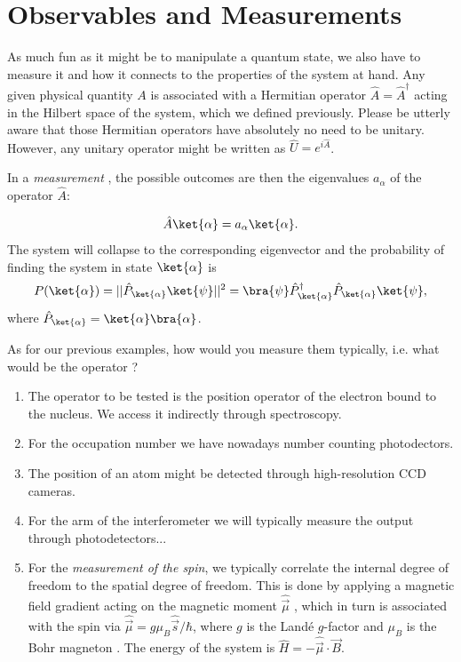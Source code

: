 \section{Observables and Measurements}
As much fun as it might be to manipulate a quantum state, we also have to measure it and how it connects to the properties of the system at hand. Any given physical quantity $A$ is associated with a Hermitian operator $\hat{A} = \hat{A}^\dag$ acting in the Hilbert space of the system, which we defined previously. Please be utterly aware that those Hermitian operators have absolutely no need to be unitary. However, any unitary operator might be written as $\hat{U}= e^{i\hat{A}}$.

In a \emph{measurement} , the possible outcomes are then the eigenvalues $a_\alpha$  of the operator $\hat{A}$:

\begin{align}
	\hat{A}\ket{\alpha}=a_{\alpha}\ket{\alpha}.
\end{align}
The system will collapse to the corresponding eigenvector and the probability of finding the system in state $\ket{\alpha}$ is
\begin{align}
	P(\ket{\alpha})=||\hat{P}_{\ket{\alpha}} \ket{\psi}||^2 = \bra{\psi} \hat{P}^{\dag}_{\ket{\alpha}} \hat{P}_{\ket{\alpha}} \ket{\psi},
\end{align}
where $\hat{P}_{\ket{\alpha}}= \ket{\alpha} \bra{\alpha}$.

As for our previous examples, how would you measure them typically, i.e. what would be the operator ?
\begin{enumerate}
\item The operator to be tested is the position operator of the electron bound to the nucleus. We access it indirectly through spectroscopy.
\item For the occupation number we have nowadays number counting photodectors.
\item The position of an atom might be detected through high-resolution CCD cameras.
\item For the arm of the interferometer we will typically measure the output through photodetectors...
\item For the \textit{measurement of the spin}, we typically correlate the internal degree of freedom to the spatial degree of freedom. This is done by applying a magnetic field gradient acting on the magnetic moment $\hat{\vec{\mu}}$ , which in turn is associated with the spin via $\hat{\vec{\mu}} = g \mu_B \hat{\vec{s}}/\hbar$, where $g$ is the Landé $g$-factor  and $\mu_B$ is the Bohr magneton . The energy of the system is $\hat{H} = -\hat{\vec{\mu}} \cdot \vec{B}$.
\end{enumerate}